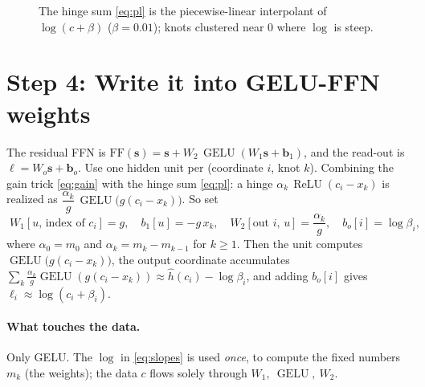 \documentclass[11pt]{article}
\newcommand{\relu}{\operatorname{ReLU}}
\newcommand{\gelu}{\operatorname{GELU}}
\begin{document}
\begin{figure}[h]
\centering
{}
\caption{The hinge sum \eqref{eq:pl} is the piecewise-linear interpolant of $\log(c+\beta)$
($\beta=0.01$); knots clustered near $0$ where $\log$ is steep.}
\label{fig:log}
\end{figure}

\section{Step 4: Write it into GELU-FFN weights}

The residual FFN is $\mathrm{FF}(\mathbf s)=\mathbf s+W_2\,\gelu(W_1\mathbf s+\mathbf b_1)$,
and the read-out is $\boldsymbol\ell=W_o\mathbf s+\mathbf b_o$. Use one hidden unit per
(coordinate $i$, knot $k$). Combining the gain trick \eqref{eq:gain} with the hinge sum
\eqref{eq:pl}: a hinge $\alpha_k\,\relu(c_i-x_k)$ is realized as
$\dfrac{\alpha_k}{g}\,\gelu\!\big(g(c_i-x_k)\big)$. So set
\[
\boxed{\;
W_1[u,\,\text{index of }c_i]=g,\quad
b_1[u]=-g\,x_k,\quad
W_2[\text{out }i,\,u]=\frac{\alpha_k}{g},\quad
b_o[i]=\log\beta_i,\;}
\]
where $\alpha_0=m_0$ and $\alpha_k=m_k-m_{k-1}$ for $k\ge1$. Then the unit computes
$\gelu\!\big(g(c_i-x_k)\big)$, the output coordinate accumulates
$\sum_k \tfrac{\alpha_k}{g}\gelu(g(c_i-x_k))\approx\hat h(c_i)-\log\beta_i$, and adding
$b_o[i]$ gives $\ell_i\approx\log(c_i+\beta_i)$.

\paragraph{What touches the data.} Only GELU. The $\log$ in \eqref{eq:slopes} is used
\emph{once}, to compute the fixed numbers $m_k$ (the weights); the data $c$ flows solely
through $W_1,\ \gelu,\ W_2$.
\end{document}
